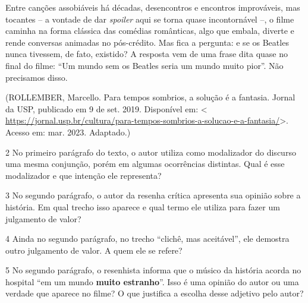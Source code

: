{Entre canções assobiáveis há décadas, desencontros e encontros
improváveis, mas tocantes -- a vontade de dar \emph{spoiler} aqui se
torna quase incontornável --, o filme caminha na forma clássica das
comédias românticas, algo que embala, diverte e rende conversas animadas
no pós-crédito. Mas fica a pergunta: e se os Beatles nunca tivessem, de
fato, existido? A resposta vem de uma frase dita quase no final do
filme: ``Um mundo sem os Beatles seria um mundo muito pior''. Não
precisamos disso.

(ROLLEMBER, Marcello. Para tempos sombrios, a solução é a fantasia.
Jornal da USP, publicado em 9 de set. 2019. Disponível em: \textless{}
\url{https://jornal.usp.br/cultura/para-tempos-sombrios-a-solucao-e-a-fantasia/}\textgreater.
Acesso em: mar. 2023. Adaptado.)

\num{2} No primeiro parágrafo do texto, o autor utiliza como modalizador
do discurso uma mesma conjunção, porém em algumas ocorrências distintas.
Qual é esse modalizador e que intenção ele representa?



\num{3} No segundo parágrafo, o autor da resenha crítica apresenta sua
opinião sobre a história. Em qual trecho isso aparece e qual termo ele
utiliza para fazer um julgamento de valor?



\num{4} Ainda no segundo parágrafo, no trecho ``clichê, mas aceitável'',
ele demostra outro julgamento de valor. A quem ele se refere?



\num{5} No segundo parágrafo, o resenhista informa que o músico da
história acorda no hospital ``em um mundo \textbf{muito estranho}''.
Isso é uma opinião do autor ou uma verdade que aparece no filme? O que
justifica a escolha desse adjetivo pelo autor?



}
